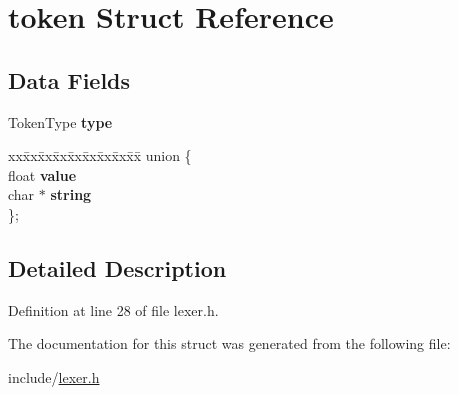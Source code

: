 \hypertarget{structtoken}{}\section{token Struct Reference}
\label{structtoken}
\subsection*{Data Fields}
\begin{DoxyCompactItemize}
\item 
\mbox{\label{structtoken_a0ccfb094c0dce37e1bae7d990c06cc92}} 
Token\+Type {\bfseries type}
\item 
\mbox{\label{structtoken_a190debb836449cf0dac5259172bfe592}} 
\begin{tabbing}
xx\=xx\=xx\=xx\=xx\=xx\=xx\=xx\=xx\=\kill
union \{\\
\>float {\bfseries value}\\
\>char $\ast$ {\bfseries string}\\
\}; \\

\end{tabbing}\end{DoxyCompactItemize}


\subsection{Detailed Description}


Definition at line 28 of file lexer.\+h.



The documentation for this struct was generated from the following file\+:\begin{DoxyCompactItemize}
\item 
include/\hyperlink{lexer_8h}{lexer.\+h}\end{DoxyCompactItemize}
